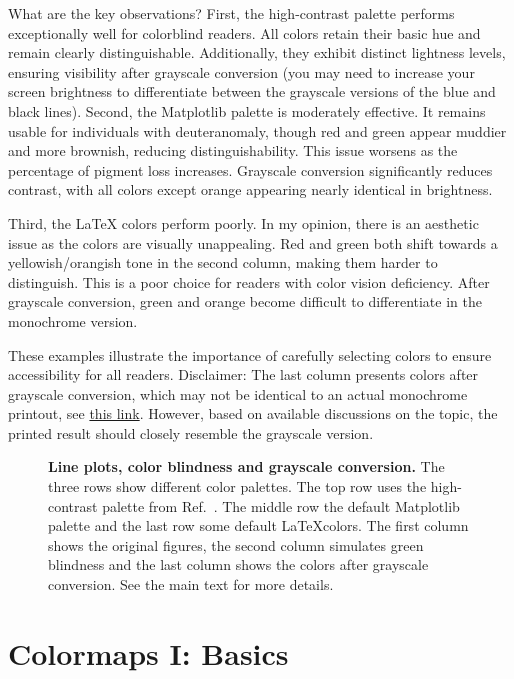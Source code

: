 What are the key observations?
First, the high-contrast palette performs exceptionally well for colorblind readers.
All colors retain their basic hue and remain clearly distinguishable. Additionally, they exhibit distinct lightness levels, ensuring visibility after grayscale conversion (you may need to increase your screen brightness to differentiate between the grayscale versions of the blue and black lines).
Second, the Matplotlib palette is moderately effective. It remains usable for individuals with deuteranomaly, though red and green appear muddier and more brownish, reducing distinguishability. This issue worsens as the percentage of pigment loss increases. Grayscale conversion significantly reduces contrast, with all colors except orange appearing nearly identical in brightness.

Third, the LaTeX colors perform poorly. In my opinion, there is an aesthetic issue as the colors are visually unappealing. Red and green both shift towards a yellowish/orangish tone in the second column, making them harder to distinguish. This is a poor choice for readers with color vision deficiency. After grayscale conversion, green and orange become difficult to differentiate in the monochrome version.

These examples illustrate the importance of carefully selecting colors to ensure accessibility for all readers. Disclaimer: The last column presents colors after grayscale conversion, which may not be identical to an actual monochrome printout, see \href{https://1800officesolutions.com/monochrome-vs-grayscale-printing/}{this link}. However, based on available discussions on the topic, the printed result should closely resemble the grayscale version.

\begin{figure}
	\centering 
	
	\caption{\textbf{Line plots, color blindness and grayscale conversion.} The three rows show different color palettes. The top row uses the high-contrast palette from Ref.~\cite{paultol}. The middle row the default Matplotlib palette and the last row some default \LaTeX colors. The first column shows the original figures, the second column simulates green blindness and the last column shows the colors after grayscale conversion. See the main text for more details.}
	\label{fig:lineplotcolorblindness}
\end{figure}

\section{Colormaps I: Basics}

